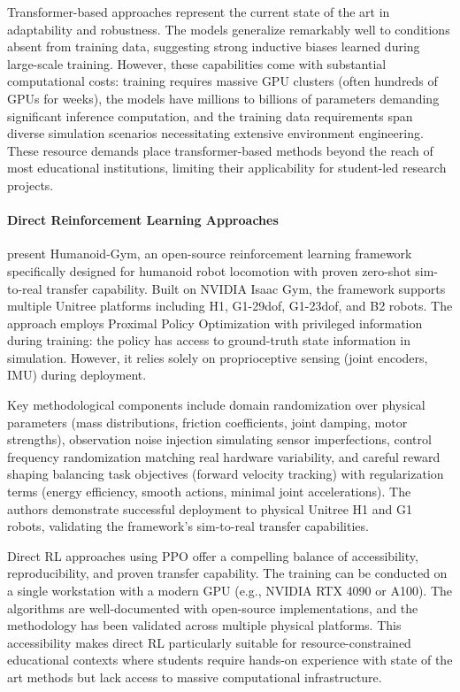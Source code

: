 \documentclass[12pt,a4paper]{article}
\begin{document}
Transformer-based approaches represent the current state of the art in adaptability and robustness. The models generalize remarkably well to conditions absent from training data, suggesting strong inductive biases learned during large-scale training. However, these capabilities come with substantial computational costs: training requires massive GPU clusters (often hundreds of GPUs for weeks), the models have millions to billions of parameters demanding significant inference computation, and the training data requirements span diverse simulation scenarios necessitating extensive environment engineering. These resource demands place transformer-based methods beyond the reach of most educational institutions, limiting their applicability for student-led research projects.

\paragraph{Direct Reinforcement Learning Approaches}

\textcite{gu2024humanoidgym} present Humanoid-Gym, an open-source reinforcement learning framework specifically designed for humanoid robot locomotion with proven zero-shot sim-to-real transfer capability. Built on NVIDIA Isaac Gym, the framework supports multiple Unitree platforms including H1, G1-29dof, G1-23dof, and B2 robots. The approach employs Proximal Policy Optimization with privileged information during training: the policy has access to ground-truth state information in simulation. However, it relies solely on proprioceptive sensing (joint encoders, IMU) during deployment.

Key methodological components include domain randomization over physical parameters (mass distributions, friction coefficients, joint damping, motor strengths), observation noise injection simulating sensor imperfections, control frequency randomization matching real hardware variability, and careful reward shaping balancing task objectives (forward velocity tracking) with regularization terms (energy efficiency, smooth actions, minimal joint accelerations). The authors demonstrate successful deployment to physical Unitree H1 and G1 robots, validating the framework's sim-to-real transfer capabilities.

Direct RL approaches using PPO offer a compelling balance of accessibility, reproducibility, and proven transfer capability. The training can be conducted on a single workstation with a modern GPU (e.g., NVIDIA RTX 4090 or A100). The algorithms are well-documented with open-source implementations, and the methodology has been validated across multiple physical platforms. This accessibility makes direct RL particularly suitable for resource-constrained educational contexts where students require hands-on experience with state of the art methods but lack access to massive computational infrastructure.
\end{document}
